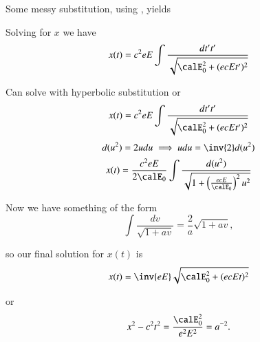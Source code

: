 {Some messy substitution, using , yields

Solving for \(x\) we have
%
\begin{equation}\label{eqn:relativisticElectrodynamicsT3:220}
x(t) = c^2 e E \int \frac{dt' t'}{\sqrt{ \calE_0^2 + (e c E t')^2 }}
\end{equation}

Can solve with hyperbolic substitution or
%
\begin{equation}\label{eqn:relativisticElectrodynamicsT3:240}
x(t) = c^2 e E \int \frac{dt' t'}{\sqrt{ \calE_0^2 + (e c E t')^2 }}
\end{equation}
%
\begin{equation}\label{eqn:relativisticElectrodynamicsT3:260}
d(u^2) = 2 u du \implies u du = \inv{2} d(u^2)
\end{equation}
%
\begin{equation}\label{eqn:relativisticElectrodynamicsT3:280}
x(t) = \frac{c^2 e E}{2 \calE_0} \int \frac{d (u^2)}{\sqrt{ 1 + \left(\frac{e c E}{\calE_0}\right)^2 u^2 }}
\end{equation}

Now we have something of the form
%
\begin{equation}\label{eqn:relativisticElectrodynamicsT3:290}
\int \frac{d v}{\sqrt{1 + a v}} = \frac{2}{a} \sqrt{1 + a v},
\end{equation}

so our final solution for \(x(t)\) is
%
\begin{equation}\label{eqn:relativisticElectrodynamicsT3:300}
x(t) = \inv{e E} \sqrt{ \calE_0^2 + (e c E t)^2 }
\end{equation}

or
%
\begin{equation}\label{eqn:relativisticElectrodynamicsT3:320}
x^2 - c^2 t^2 = \frac{\calE_0^2}{ e^2 E^2 } = a^{-2}.
\end{equation}

}
